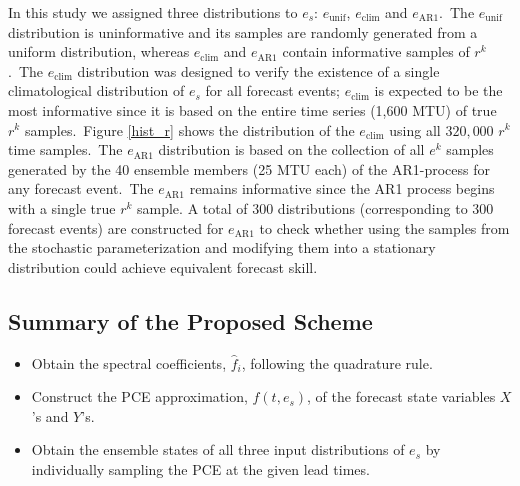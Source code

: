 			In this study we assigned three distributions to $e_s$:
			$e_{\text{unif}}$, $e_{\text{clim}}$ and $e_{\text{AR1}}$.\
			The $e_{\text{unif}}$ distribution is uninformative and its samples are randomly 
			generated from a uniform distribution,
			whereas $e_{\text{clim}}$ and $e_{\text{AR1}}$ contain informative samples of $r^k$.\
			The $e_{\text{clim}}$ distribution was designed 
			to verify the existence of a single climatological distribution of $e_s$ for all forecast events; $e_{\text{clim}}$ is
			expected to be the most informative
			since it is based on the entire time series (1,600 MTU) of true $r^k$ samples.\
			Figure {\ref{hist_r}} shows the distribution of the $e_{\text{clim}}$
			using all $320,000$ $r^k$ time samples.\
			The $e_{\text{AR1}}$ distribution is based on
			the collection of all $e^k$ samples generated by the 
			40 ensemble members (25 MTU each) of the AR1-process for any forecast event.\
			The $e_{\text{AR1}}$ remains informative
			since the AR1 process begins with a single true $r^k$ sample.
			A total of 300 distributions (corresponding to 300 forecast events) are constructed for $e_{\text{AR1}}$
			to check whether using the samples from the stochastic parameterization 
			and modifying them into a stationary
			distribution could achieve equivalent forecast skill. \
			
		\subsection{Summary of the Proposed Scheme} 
			\begin{itemize}
				\item Obtain the spectral coefficients, $\hat{f}_i$, following the quadrature rule.\
				\item Construct the PCE approximation, $f(t,e_s)$, 
					of the forecast state variables $X$'s and $Y$'s.\
				\item Obtain the ensemble states of all three input distributions of 
					$e_s$ by individually sampling the PCE at the given lead times.\		
			\end{itemize}
			
